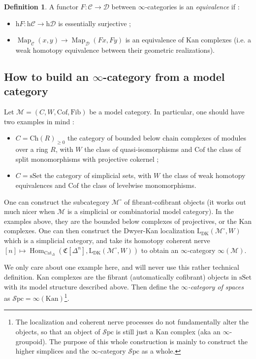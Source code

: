 \documentclass[11pt]{article}
\theoremstyle{definition}
\newtheorem{definition}{Definition}
\newcommand{\C}{\mathcal{C}}
\newcommand{\Cat}{\mathrm{Cat}}
\newcommand{\Cof}{\mathrm{Cof}}
\newcommand{\D}{\mathcal{D}}
\newcommand{\Fib}{\mathrm{Fib}}
\newcommand{\h}{\mathrm{h}}
\newcommand{\Hom}{\operatorname{Hom}}
\newcommand{\Kan}{\mathrm{Kan}}
\newcommand{\M}{\mathscr{M}}
\newcommand{\Map}{\operatorname{Map}}
\newcommand{\Spc}{\mathcal{S}\mathrm{pc}}
\newcommand{\sSet}{\mathrm{sSet}}
\begin{document}
\begin{definition}
    A functor $F : \C \to \D$ between $\infty$-categories is an \emph{equivalence} if :
    \begin{itemize}
        \item $\h F : \h\C \to \h\D$ is essentially surjective ;
        \item $\Map_{\C}(x, y) \to \Map_{\D}(Fx, Fy)$ is an equivalence of Kan complexes (i.e. a weak homotopy equivalence between their geometric realizations).
    \end{itemize}
\end{definition}

\subsection{How to build an $\infty$-category from a model category}

Let $\M = (C, W, \Cof, \Fib)$ be a model category.
In particular, one should have two examples in mind :
\begin{itemize}
    \item $C = \mathrm{Ch}(R)_{\geqslant 0}$ the category of bounded below chain complexes of modules over a ring $R$, with $W$ the class of quasi-isomorphisms and $\Cof$ the class of split monomorphisms with projective cokernel ;
    \item $C = \sSet$ the category of simplicial sets, with $W$ the class of weak homotopy equivalences and $\Cof$ the class of levelwise monomorphisms.
\end{itemize}

One can construct the subcategory $\M^{\circ}$ of fibrant-cofibrant objects (it works out much nicer when $\M$ is a simplicial or combinatorial model category).
In the examples above, they are the bounded below complexes of projectives, or the Kan complexes.
One can then construct the Dwyer-Kan localization $\mathrm{L}_{\mathrm{DK}}(\M^{\circ}, W)$ which is a simplicial category, and take its homotopy coherent nerve $[n] \mapsto \Hom_{\Cat_{\Delta}}(\mathfrak{C}[\Delta^n], \mathrm{L}_{\mathrm{DK}}(\M^{\circ}, W))$ to obtain an $\infty$-category $\infty(\M)$.

We only care about one example here, and will never use this rather technical definition.
Kan complexes are the fibrant (automatically cofibrant) objects in $\sSet$ with its model structure described above.
Then define the \emph{$\infty$-category of spaces} as $\Spc = \infty(\Kan)$\footnote{The localization and coherent nerve processes do not fundamentally alter the objects, so that an object of $\Spc$ is still just a Kan complex (aka an $\infty$-groupoid).
The purpose of this whole construction is mainly to construct the higher simplices and the $\infty$-category $\Spc$ as a whole.}.
\end{document}
